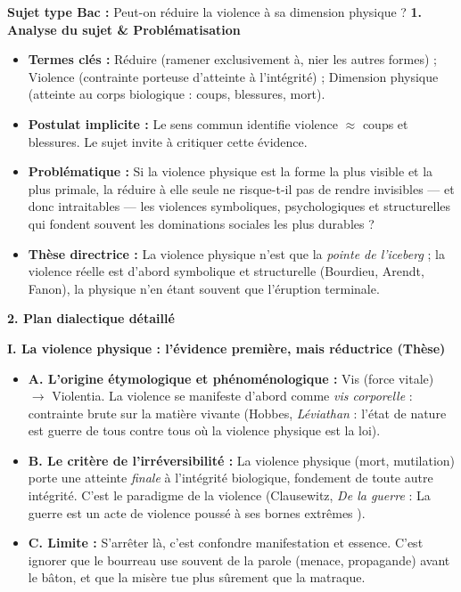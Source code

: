 \documentclass[11pt]{article}
\newcommand{\cle}[1]{{\popxbold\color{popdark}#1}}
\begin{document}
\begin{exoresolu}
\textbf{Sujet type Bac :} \guillemotleft Peut-on réduire la violence à sa dimension physique ? \guillemotright
\tcblower
\textbf{1. Analyse du sujet \& Problématisation}
\begin{itemize}
    \item \textbf{Termes clés :} \cle{Réduire} (ramener exclusivement à, nier les autres formes) ; \cle{Violence} (contrainte porteuse d'atteinte à l'intégrité) ; \cle{Dimension physique} (atteinte au corps biologique : coups, blessures, mort).
    \item \textbf{Postulat implicite :} Le sens commun identifie violence $\approx$ coups et blessures. Le sujet invite à critiquer cette évidence.
    \item \textbf{Problématique :} Si la violence physique est la forme la plus visible et la plus primale, la réduire à elle seule ne risque-t-il pas de rendre invisibles — et donc intraitables — les violences symboliques, psychologiques et structurelles qui fondent souvent les dominations sociales les plus durables ?
    \item \textbf{Thèse directrice :} La violence physique n'est que la \emph{pointe de l'iceberg} ; la violence réelle est d'abord symbolique et structurelle (Bourdieu, Arendt, Fanon), la physique n'en étant souvent que l'éruption terminale.
\end{itemize}

\textbf{2. Plan dialectique détaillé}

\textbf{I. La violence physique : l'évidence première, mais réductrice (Thèse)}
\begin{itemize}
    \item \textbf{A. L'origine étymologique et phénoménologique :} \cle{Vis} (force vitale) $\rightarrow$ \cle{Violentia}. La violence se manifeste d'abord comme \emph{vis corporelle} : contrainte brute sur la matière vivante (Hobbes, \emph{Léviathan} : l'état de nature est \guillemotleft guerre de tous contre tous \guillemotright où la violence physique est la loi).
    \item \textbf{B. Le critère de l'irréversibilité :} La violence physique (mort, mutilation) porte une atteinte \emph{finale} à l'intégrité biologique, fondement de toute autre intégrité. C'est le \cle{paradigme} de la violence (Clausewitz, \emph{De la guerre} : \guillemotleft La guerre est un acte de violence poussé à ses bornes extrêmes \guillemotright).
    \item \textbf{C. Limite :} S'arrêter là, c'est confondre \cle{manifestation} et \cle{essence}. C'est ignorer que le bourreau use souvent de la parole (menace, propagande) avant le bâton, et que la misère tue plus sûrement que la matraque.
\end{itemize}


\end{exoresolu}
\end{document}

